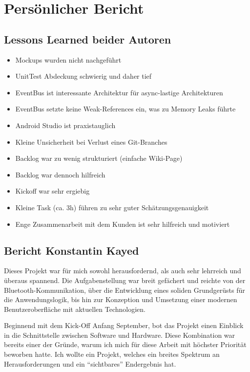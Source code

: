 \section{Persönlicher Bericht}
\label{Persönlicher Bericht}

\subsection{Lessons Learned beider Autoren}
\label{sub:lessons_learned}

\begin{itemize}
\item{Mockups wurden nicht nachgeführt}
\item{UnitTest Abdeckung schwierig und daher tief}
\item{EventBus ist interessante Architektur für async-lastige Architekturen}
\item{EventBus setzte keine Weak-References ein, was zu Memory Leaks führte}
\item{Android Studio ist praxistauglich}
\item{Kleine Unsicherheit bei Verlust eines Git-Branches}
\item{Backlog war zu wenig strukturiert (einfache Wiki-Page)}
\item{Backlog war dennoch hilfreich}
\item{Kickoff war sehr ergiebig}
\item{Kleine Task (ca. 3h) führen zu sehr guter Schätzungsgenauigkeit}
\item{Enge Zusammenarbeit mit dem Kunden ist sehr hilfreich und motiviert}
\end{itemize}

\subsection{Bericht Konstantin Kayed}

Dieses Projekt war für mich sowohl herausfordernd, als auch sehr lehrreich und überaus spannend. Die Aufgabenstellung war breit gefächert und reichte von der Bluetooth-Kommunikation, über die Entwicklung eines soliden Grundgerüsts für die Anwendungslogik, bis hin zur Konzeption und Umsetzung einer modernen Benutzeroberfläche mit aktuellen Technologien.

Beginnend mit dem Kick-Off Anfang September, bot das Projekt einen Einblick in die Schnittstelle zwischen Software und Hardware. Diese Kombination war bereits einer der Gründe, warum ich mich für diese Arbeit mit höchster Priorität beworben hatte. Ich wollte ein Projekt, welches ein breites Spektrum an Herausforderungen und ein \enquote{sichtbares} Endergebnis hat.

